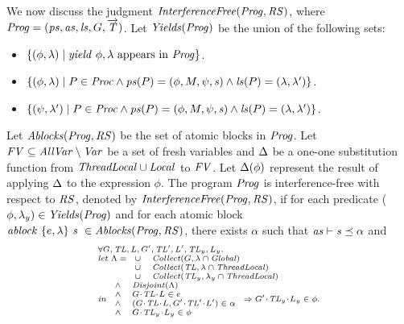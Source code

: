 We now discuss the judgment $\mathit{InterferenceFree}(\mathit{Prog},\mathit{RS})$,
where $\mathit{Prog} = (\mathit{ps}, \mathit{as}, \mathit{ls}, G, \overrightarrow{\mathit{T}})$. 
Let $\mathit{Yields}(\mathit{Prog})$ be the union of the following sets:
\begin{itemize}
\item
$\{(\phi,\lambda) \mid \mathit{yield}\ \phi,\lambda~\mathrm{appears~in~\mathit{Prog}}\}$.
\item
$\{(\phi,\lambda) \mid P \in \mathit{Proc} \wedge \mathit{ps}(P) = (\phi, M, \psi, \mathit{s}) \wedge \mathit{ls}(P) = (\lambda,\lambda')\}$.
\item
$\{(\psi,\lambda') \mid P \in \mathit{Proc} \wedge \mathit{ps}(P) = (\phi, M, \psi, \mathit{s}) \wedge \mathit{ls}(P) = (\lambda,\lambda')\}$.
\end{itemize}
Let $\mathit{Ablocks}(\mathit{Prog},\mathit{RS})$ be the set of atomic blocks in $\mathit{Prog}$.
Let $\mathit{FV} \subseteq \mathit{AllVar} \setminus \mathit{Var}$ be a set of fresh variables and $\Delta$ be a one-one 
substitution function from $\mathit{ThreadLocal} \cup \mathit{Local}$ to $\mathit{FV}$.
Let $\Delta(\phi)$ represent the result of applying $\Delta$ to the expression $\phi$.
The program $\mathit{Prog}$ is interference-free with respect to $\mathit{RS}$, denoted by $\mathit{InterferenceFree}(\mathit{Prog},\mathit{RS})$,
if for each predicate ($\phi,\lambda_y) \in \mathit{Yields}(\mathit{Prog})$ and 
for each atomic block $\mathit{ablock}\ {\{e,\lambda\}}\ {\mathit{s}}\  \in \mathit{Ablocks}(\mathit{Prog},\mathit{RS})$, there exists $\alpha$ such that 
$\mathit{as} \vdash \mathit{s} \preceq \alpha$ and 
\[
\scriptsize{
\begin{array}{l}
\forall \varsG,\varsTL,\varsL,\varsG',\varsTL',\varsL',\varsTL_y,\varsL_y.\\ 
\mathit{let}\ \Lambda =
\begin{array}[t]{ll}
\cup & \Collect(\varsG, \lins \cap \Global) \\
\cup & \Collect(\varsTL, \lins \cap \ThreadLocal) \\
\cup & \Collect(\varsTL_y, \lins_y \cap \ThreadLocal) 
\end{array} \\
\mathit{in}\
\begin{array}{ll}
\wedge & \Disjoint(\Lambda) \\
\wedge & \MakeStore{\varsG}{\varsTL}{\varsL} \in e \\
\wedge & (\MakeStore{\varsG}{\varsTL}{\varsL}, \MakeStore{\varsG'}{\varsTL'}{\varsL'}) \in \alpha \\
\wedge & \MakeStore{\varsG}{\varsTL_y}{\varsL_y} \in \phi
\end{array}
\Rightarrow \MakeStore{\varsG'}{\varsTL_y}{\varsL_y} \in \phi.
\end{array}
}
\]

